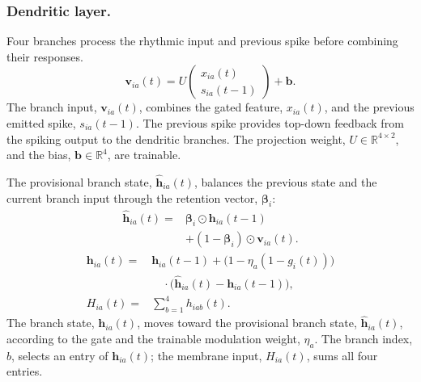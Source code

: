 \subsubsection{Dendritic layer.}
Four branches process the rhythmic input and previous spike before combining their responses.
\begin{equation}
\boldsymbol v_{ia}(t)=U\begin{pmatrix}x_{ia}(t)\\s_{ia}(t-1)\end{pmatrix}+\boldsymbol b.
\end{equation}
The branch input, $\boldsymbol v_{ia}(t)$, combines the gated feature, $x_{ia}(t)$, and the
previous emitted spike, $s_{ia}(t-1)$. The previous spike provides top-down feedback from the
spiking output to the dendritic branches. The projection weight, $U\in\mathbb R^{4\times2}$, and
the bias, $\boldsymbol b\in\mathbb R^4$, are trainable.

The provisional branch state, $\widehat{\boldsymbol h}_{ia}(t)$, balances the previous state and
the current branch input through the retention vector, $\boldsymbol\beta_i$:
\begin{equation}\label{eq:branch-provisional}
\begin{aligned}
\widehat{\boldsymbol h}_{ia}(t)={}&\boldsymbol\beta_i\odot\boldsymbol h_{ia}(t-1)\\
&+(1-\boldsymbol\beta_i)\odot\boldsymbol v_{ia}(t).
\end{aligned}
\end{equation}
\begin{equation}
\begin{aligned}
\boldsymbol h_{ia}(t)={}&\boldsymbol h_{ia}(t-1)
+\bigl(1-\eta_a(1-g_i(t))\bigr)\\
&\quad{}\cdot\bigl(\widehat{\boldsymbol h}_{ia}(t)-\boldsymbol h_{ia}(t-1)\bigr),\\
H_{ia}(t)={}&\sum_{b=1}^{4}h_{iab}(t).
\end{aligned}
\end{equation}
The branch state, $\boldsymbol h_{ia}(t)$, moves toward the provisional branch state,
$\widehat{\boldsymbol h}_{ia}(t)$, according to the gate and the trainable modulation weight,
$\eta_a$. The branch index, $b$, selects an entry of $\boldsymbol h_{ia}(t)$; the membrane input,
$H_{ia}(t)$, sums all four entries.


